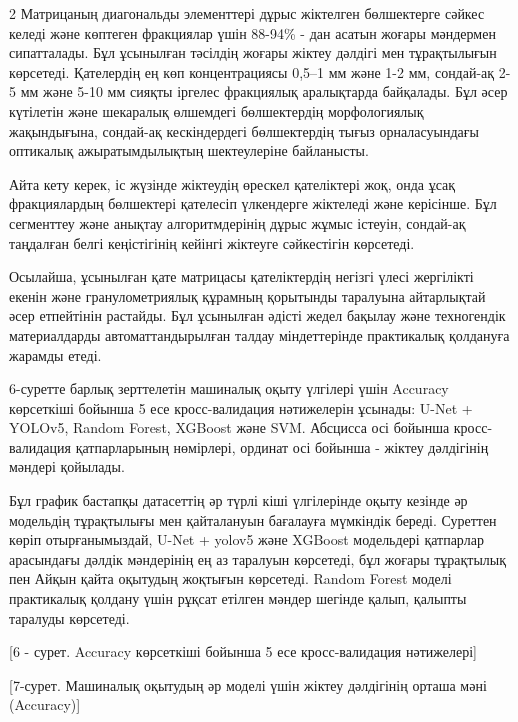 \begin{multicols}{2}
Матрицаның диагональды элементтері дұрыс жіктелген бөлшектерге сәйкес
келеді және көптеген фракциялар үшін 88-94\% - дан асатын жоғары
мәндермен сипатталады. Бұл ұсынылған тәсілдің жоғары жіктеу дәлдігі мен
тұрақтылығын көрсетеді. Қателердің ең көп концентрациясы 0,5--1 мм және
1-2 мм, сондай-ақ 2-5 мм және 5-10 мм сияқты іргелес фракциялық
аралықтарда байқалады. Бұл әсер күтілетін және шекаралық өлшемдегі
бөлшектердің морфологиялық жақындығына, сондай-ақ кескіндердегі
бөлшектердің тығыз орналасуындағы оптикалық ажыратымдылықтың
шектеулеріне байланысты.

Айта кету керек, іс жүзінде жіктеудің өрескел қателіктері жоқ, онда ұсақ
фракциялардың бөлшектері қателесіп үлкендерге жіктеледі және керісінше.
Бұл сегменттеу және анықтау алгоритмдерінің дұрыс жұмыс істеуін,
сондай-ақ таңдалған белгі кеңістігінің кейінгі жіктеуге сәйкестігін
көрсетеді.

Осылайша, ұсынылған қате матрицасы қателіктердің негізгі үлесі
жергілікті екенін және гранулометриялық құрамның қорытынды таралуына
айтарлықтай әсер етпейтінін растайды. Бұл ұсынылған әдісті жедел бақылау
және техногендік материалдарды автоматтандырылған талдау міндеттерінде
практикалық қолдануға жарамды етеді.

6-суретте барлық зерттелетін машиналық оқыту үлгілері үшін Accuracy
көрсеткіші бойынша 5 есе кросс-валидация нәтижелерін ұсынады: U-Net +
YOLOv5, Random Forest, XGBoost және SVM. Абсцисса осі бойынша
кросс-валидация қатпарларының нөмірлері, ординат осі бойынша - жіктеу
дәлдігінің мәндері қойылады.

Бұл график бастапқы датасеттің әр түрлі кіші үлгілерінде оқыту кезінде
әр модельдің тұрақтылығы мен қайталануын бағалауға мүмкіндік береді.
Суреттен көріп отырғанымыздай, U-Net + yolov5 және XGBoost модельдері
қатпарлар арасындағы дәлдік мәндерінің ең аз таралуын көрсетеді, бұл
жоғары тұрақтылық пен Айқын қайта оқытудың жоқтығын көрсетеді. Random
Forest моделі практикалық қолдану үшін рұқсат етілген мәндер шегінде
қалып, қалыпты таралуды көрсетеді.
\end{multicols}

[6 - сурет. Accuracy көрсеткіші бойынша 5 есе кросс-валидация
нәтижелері]

[7-сурет. Машиналық оқытудың әр моделі үшін жіктеу дәлдігінің
орташа мәні (Accuracy)]

